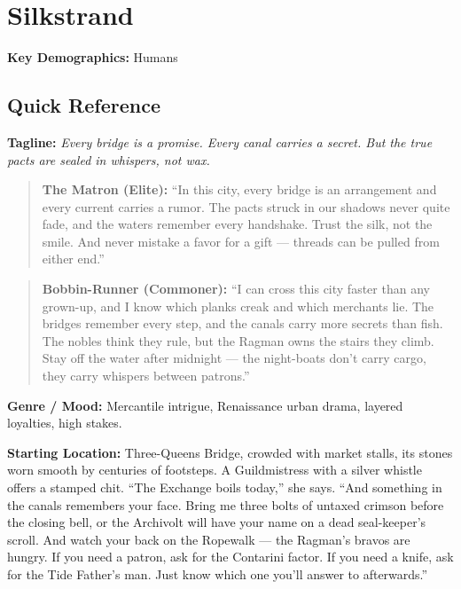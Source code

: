 \section{Silkstrand}
\label{chap:silkstrand}

\textbf{Key Demographics: } Humans

\subsection*{Quick Reference}
\textbf{Tagline:} \textit{Every bridge is a promise. Every canal carries a secret. But the true pacts are sealed in whispers, not wax.}

\begin{quote}
  \textbf{The Matron (Elite):}  
  ``In this city, every bridge is an arrangement and every current carries a rumor. The pacts struck in our shadows never quite fade, and the waters remember every handshake. Trust the silk, not the smile. And never mistake a favor for a gift --- threads can be pulled from either end.''
\end{quote}

\begin{quote}
  \textbf{Bobbin-Runner (Commoner):}  
  ``I can cross this city faster than any grown-up, and I know which planks creak and which merchants lie. The bridges remember every step, and the canals carry more secrets than fish. The nobles think they rule, but the Ragman owns the stairs they climb. Stay off the water after midnight --- the night-boats don't carry cargo, they carry whispers between patrons.''
\end{quote}

\noindent\textbf{Genre / Mood:} Mercantile intrigue, Renaissance urban drama, layered loyalties, high stakes.

\noindent\textbf{Starting Location:} Three-Queens Bridge, crowded with market stalls, its stones worn smooth by centuries of footsteps. A Guildmistress with a silver whistle offers a stamped chit. ``The Exchange boils today,'' she says. ``And something in the canals remembers your face. Bring me three bolts of untaxed crimson before the closing bell, or the Archivolt will have your name on a dead seal-keeper's scroll. And watch your back on the Ropewalk --- the Ragman's bravos are hungry. If you need a patron, ask for the Contarini factor. If you need a knife, ask for the Tide Father's man. Just know which one you'll answer to afterwards.''

